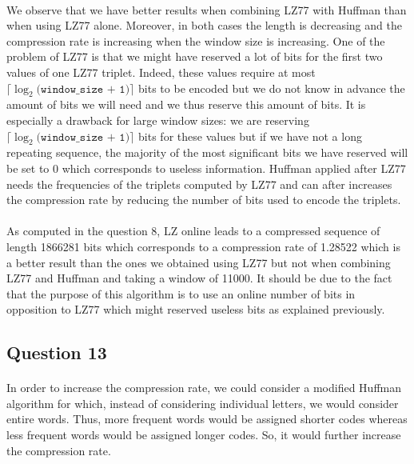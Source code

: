\documentclass[a4paper, 11pt, oneside]{article}
\begin{document}
\paragraph{}We observe that we have better results when combining LZ77 with Huffman than when using LZ77 alone. Moreover, in both cases the length is decreasing and the compression rate is increasing when the window size is increasing.
One of the problem of LZ77 is that we might have reserved a lot of bits for the first two values of one LZ77 triplet. Indeed, these values require at most $\lceil\log_2({\texttt{window\_size + 1})}\rceil$ bits to be encoded but we do not know in advance the amount of bits we will need and we thus reserve this amount of bits. It is especially a drawback for large window sizes: we are reserving $\lceil\log_2({\texttt{window\_size + 1})}\rceil$  bits for these values but
if we have not a long repeating sequence, the majority of the most significant bits we have reserved will be set to 0 which corresponds to useless information. Huffman applied after LZ77 needs the frequencies of the triplets computed by LZ77 
and can after increases the compression rate by reducing the number of bits used to encode the triplets.

\paragraph{}As computed in the question 8, LZ online leads to a compressed sequence of length 1866281 bits which corresponds to a compression rate of 1.28522 which is a better result than the ones we obtained using LZ77 but not when combining LZ77 and Huffman and taking a window of 11000.
It should be due to the fact that the purpose of this algorithm is to use an online number of bits in opposition to LZ77 which might reserved useless bits as explained previously.

\subsection{Question 13}
\paragraph{}In order to increase the compression rate, we could consider a modified Huffman algorithm for which, instead of considering individual letters, we would consider
entire words. Thus, more frequent words would be assigned shorter codes whereas less frequent words would be assigned longer codes.
So, it would further increase the compression rate.
\end{document}
